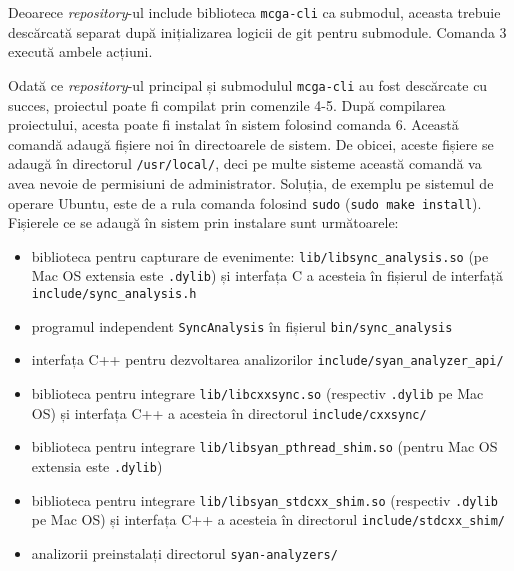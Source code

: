 Deoarece \textit{repository}-ul include biblioteca
\lstinline{mcga-cli}\cite{mcga-cli} ca submodul, aceasta trebuie
descărcată separat după inițializarea logicii de git pentru submodule.
Comanda 3 execută ambele acțiuni.

Odată ce \textit{repository}-ul principal și submodulul
\lstinline{mcga-cli} au fost descărcate cu succes, proiectul poate fi
compilat prin comenzile 4-5. După compilarea proiectului, acesta poate
fi instalat în sistem folosind comanda 6. Această comandă adaugă fișiere
noi în directoarele de sistem. De obicei, aceste fișiere se adaugă în
directorul \lstinline{/usr/local/}, deci pe multe sisteme această
comandă va avea nevoie de permisiuni de administrator. Soluția, de
exemplu pe sistemul de operare Ubuntu, este de a rula comanda folosind
\lstinline{sudo} (\lstinline{sudo make install}). Fișierele ce se adaugă
în sistem prin instalare sunt următoarele:

\begin{itemize}
    \item biblioteca pentru capturare de evenimente:
    \lstinline{lib/libsync_analysis.so} (pe Mac OS extensia este
    \lstinline{.dylib}) și interfața C a acesteia în fișierul de
    interfață \lstinline{include/sync_analysis.h}
    \item programul independent \lstinline{SyncAnalysis} în fișierul
    \lstinline{bin/sync_analysis}
    \item interfața C++ pentru dezvoltarea analizorilor
    \lstinline{include/syan_analyzer_api/}
    \item biblioteca pentru integrare \lstinline{lib/libcxxsync.so}
    (respectiv \lstinline{.dylib} pe Mac OS) și interfața C++ a
    acesteia în directorul \lstinline{include/cxxsync/}
    \item biblioteca pentru integrare
    \lstinline{lib/libsyan_pthread_shim.so} (pentru Mac OS extensia este
    \lstinline{.dylib})
    \item biblioteca pentru integrare
    \lstinline{lib/libsyan_stdcxx_shim.so} (respectiv
    \lstinline{.dylib} pe Mac OS) și interfața C++ a acesteia în
    directorul \lstinline{include/stdcxx_shim/}
    \item analizorii preinstalați directorul \lstinline{syan-analyzers/}
\end{itemize}
